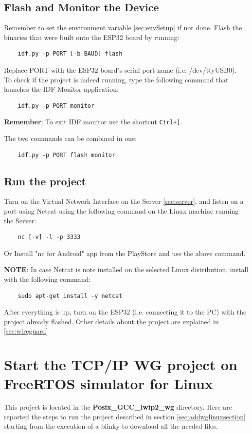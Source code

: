 \subsection{Flash and Monitor the Device}
Remember to set the environment variable \ref{sec:envSetup} if not done.
Flash the binaries that were built onto the ESP32 board by running:
\begin{lstlisting}
    idf.py -p PORT [-b BAUD] flash
\end{lstlisting}

Replace PORT with the ESP32 board’s serial port name (i.e. /dev/ttyUSB0).
\\To check if the project is indeed running, type the following command that launches the IDF Monitor application:
\begin{lstlisting}
    idf.py -p PORT monitor
\end{lstlisting}

\textbf{Remember}: To exit IDF monitor use the shortcut \texttt{Ctrl+{]}}.

The two commands can be combined in one:
\begin{lstlisting}
    idf.py -p PORT flash monitor
\end{lstlisting}

\subsection{Run the project}
Turn on the Virtual Network Interface on the Server \ref{sec:server}, and listen on a port using Netcat\cite{Netcat} using the following command on the Linux machine running the Server:
\begin{lstlisting}
    nc [-v] -l -p 3333  
\end{lstlisting} 

Or Install "nc for Android" app from the PlayStore \cite{Netcat_android} and use the above command.

\textbf{NOTE}: In case Netcat is note installed on the selected Linux distribution, install with the following command:
\begin{lstlisting}
    sudo apt-get install -y netcat
\end{lstlisting}

After everything is up, turn on the ESP32 (i.e. connecting it to the PC) with the project already flashed.
Other details about the project are explained in \ref{sec:wireguard} 

\section{Start the TCP/IP WG project on FreeRTOS simulator for Linux}\label{sec:WGRtos}
This project is located in the \textbf{Posix\_GCC\_lwip2\_wg} directory.
Here are reported the steps to run the project described in section \ref{sec:addwglinuxsection} starting from the execution of a blinky to download all the needed files.

